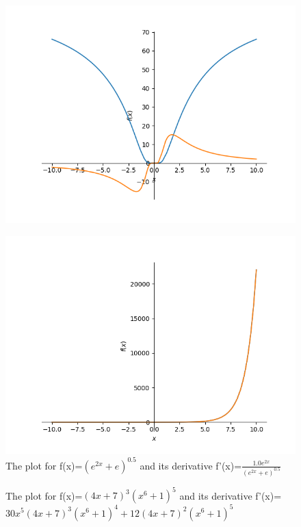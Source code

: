 \documentclass{article}
\begin{document}
\begin{figure}
\includegraphics{plot_20}
\end{figure}\begin{figure}
\caption{The plot for f(x)=$\left(e^{2 x} + e\right)^{0.5}$ and its derivative f'(x)=$\frac{1.0 e^{2 x}}{\left(e^{2 x} + e\right)^{0.5}}$}
\centering
\includegraphics{plot_21}
\end{figure}\begin{figure}
\caption{The plot for f(x)=$\left(4 x + 7\right)^{3} \left(x^{6} + 1\right)^{5}$ and its derivative f'(x)=$30 x^{5} \left(4 x + 7\right)^{3} \left(x^{6} + 1\right)^{4} + 12 \left(4 x + 7\right)^{2} \left(x^{6} + 1\right)^{5}$}
\centering

\end{figure}
\end{document}

